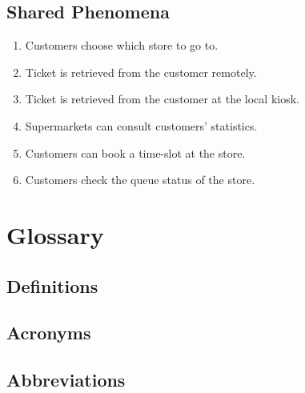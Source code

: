 \subsection{Shared Phenomena}
\begin{enumerate}[label=\textbf{SP.\arabic*}]
	\item Customers choose which store to go to.
	\item Ticket is retrieved from the customer remotely.
	\item Ticket is retrieved from the customer at the local kiosk.
	\item Supermarkets can consult customers' statistics.
	\item Customers can book a time-slot at the store.
	\item Customers check the queue status of the store.
\end{enumerate}

\section{Glossary}
\subsection{Definitions}
\subsection{Acronyms}
\subsection{Abbreviations}